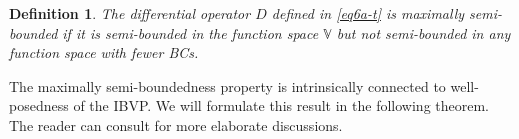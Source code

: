 \documentclass{article}
\numberwithin{equation}{section}
\newtheorem{definition}{Definition}
\theoremstyle{definition}
\begin{document}
\begin{definition}\label{eqn:maximal}
The differential operator $D$ defined in \eqref{eq6a-t} is maximally semi-bounded if it is semi-bounded in the function space $\mathbb{V}$
but not semi-bounded in any function space with fewer BCs.
\end{definition}
\noindent
The maximally semi-boundedness property  is intrinsically connected to well-posedness of the IBVP. We will formulate this result in the following theorem. The reader can consult \cite{gustafsson1995time} for more elaborate discussions.
\end{document}
